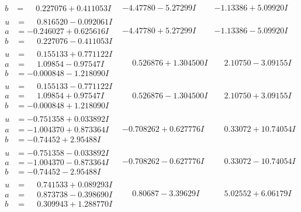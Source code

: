 \documentclass[1p]{elsarticle_modified}
\theoremstyle{definition}
\begin{document}
$$\begin{array}{c|c|c}
\begin{aligned}
b &= \phantom{-}0.227076 + 0.411053 I\end{aligned}
 & -4.47780 - 5.27299 I & -1.13386 + 5.09920 I \\ \hline\begin{aligned}
u &= \phantom{-}0.816520 - 0.092061 I \\
a &= -0.246027 + 0.625616 I \\
b &= \phantom{-}0.227076 - 0.411053 I\end{aligned}
 & -4.47780 + 5.27299 I & -1.13386 - 5.09920 I \\ \hline\begin{aligned}
u &= \phantom{-}0.155133 + 0.771122 I \\
a &= \phantom{-}1.09854 - 0.97547 I \\
b &= -0.000848 - 1.218090 I\end{aligned}
 & \phantom{-}0.526876 + 1.304500 I & \phantom{-}2.10750 - 3.09155 I \\ \hline\begin{aligned}
u &= \phantom{-}0.155133 - 0.771122 I \\
a &= \phantom{-}1.09854 + 0.97547 I \\
b &= -0.000848 + 1.218090 I\end{aligned}
 & \phantom{-}0.526876 - 1.304500 I & \phantom{-}2.10750 + 3.09155 I \\ \hline\begin{aligned}
u &= -0.751358 + 0.033892 I \\
a &= -1.004370 + 0.873364 I \\
b &= -0.74452 + 2.95488 I\end{aligned}
 & -0.708262 + 0.627776 I & \phantom{-}0.33072 + 10.74054 I \\ \hline\begin{aligned}
u &= -0.751358 - 0.033892 I \\
a &= -1.004370 - 0.873364 I \\
b &= -0.74452 - 2.95488 I\end{aligned}
 & -0.708262 - 0.627776 I & \phantom{-}0.33072 - 10.74054 I \\ \hline\begin{aligned}
u &= \phantom{-}0.741533 + 0.089293 I \\
a &= \phantom{-}0.873738 - 0.398690 I \\
b &= \phantom{-}0.309943 + 1.288770 I\end{aligned}
 & \phantom{-}0.80687 - 3.39629 I & \phantom{-}5.02552 + 6.06179 I \\ \hline\begin{aligned}

\end{aligned}
\end{array}$$
\end{document}
